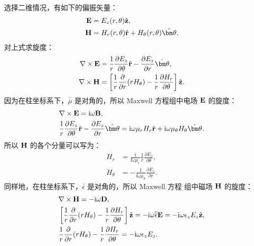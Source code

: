 \documentclass{sjtureport}
\begin{document}
选择二维情况，有如下的偏振矢量：
\begin{subequations}
	\begin{align}
		{\bf E} & = E_z(r, \theta) \hat{\bf z},                                       \\
		{\bf H} & = H_r(r, \theta) \hat{\bf r} + H_\theta(r, \theta) \hat{\bm\theta}.
	\end{align}
\end{subequations}
对上式求旋度：
\begin{subequations}
	\begin{align}
		\nabla \times {\bf E} & = \frac{1}{r} \frac{\partial E_z}{\partial\theta}
		\hat{\bf r} - \frac{\partial E_z}{\partial r} \hat{\bm\theta},            \\
		\nabla \times {\bf H} & = \left[\frac{1}{r} \frac{\partial}{\partial r}
			(r H_\theta) - \frac{1}{r} \frac{\partial H_r}{\partial\theta} \right]
		\hat{\bf z}.
	\end{align}
\end{subequations}
因为在柱坐标系下，$\overline{\overline\mu}$ 是对角的，所以 Maxwell 方程组中电场
$\bf E$ 的旋度：
\begin{subequations}
	\begin{align}
		 & \nabla \times {\bf E} = \ii \omega {\bf B},                   \\
		 & \frac{1}{r} \frac{\partial E_z}{\partial\theta} \hat{\bf r} -
		\frac{\partial E_z}{\partial r}\hat{\bm\theta} = \ii \omega \mu_r H_r
		\hat{\bf r} + \ii \omega \mu_\theta H_\theta \hat{\bm\theta}.
	\end{align}
\end{subequations}
所以 $\bf H$ 的各个分量可以写为：
\begin{subequations}
	\begin{align}
		H_r      & = \frac{1}{\ii \omega \mu_r} \frac{1}{r}
		\frac{\partial E_z}{\partial\theta},                \\
		H_\theta & = -\frac{1}{\ii \omega \mu_\theta}
		\frac{\partial E_z}{\partial r}.
	\end{align}
\end{subequations}
同样地，在柱坐标系下，$\overline{\overline\epsilon}$ 是对角的，所以 Maxwell 方程
组中磁场 $\bf H$ 的旋度：
\begin{subequations}
	\begin{align}
		 & \nabla \times {\bf H} = -\mathrm{i} \omega {\bf D},                            \\
		 & \left[\frac{1}{r} \frac{\partial}{\partial r}(r H_\theta) - \frac{1}{r}
			\frac{\partial H_r}{\partial\theta} \right] \hat{\bf z} = -\mathrm{i} \omega
		{\overline{\overline\epsilon}} {\bf E} = -\mathrm{i} \omega \epsilon_z E_z
		\hat{\bf z},                                                               \\
		 & \frac{1}{r} \frac{\partial}{\partial r}(r H_\theta) - \frac{1}{r}
		\frac{\partial H_r}{\partial\theta} = -\mathrm{i} \omega \epsilon_z E_z.
	\end{align}
\end{subequations}
\end{document}
